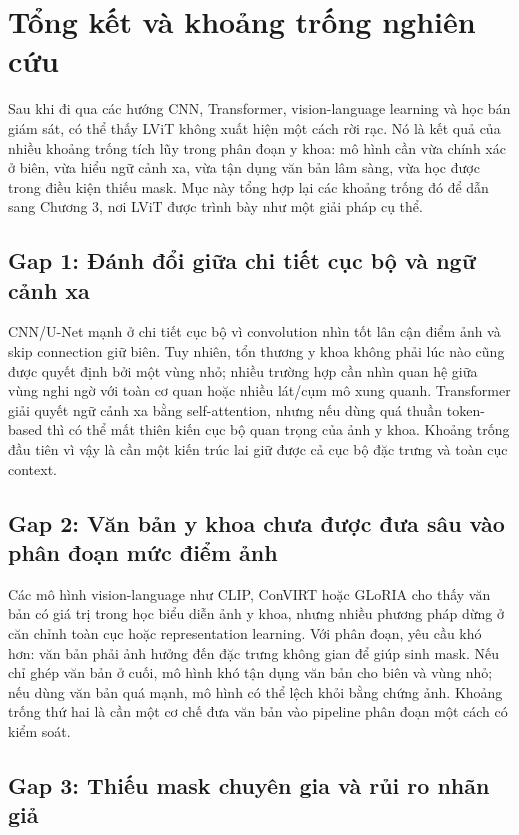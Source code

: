 \section{Tổng kết và khoảng trống nghiên cứu}

Sau khi đi qua các hướng CNN, Transformer, vision-language learning và học bán giám sát, có thể thấy LViT không xuất hiện một cách rời rạc. Nó là kết quả của nhiều khoảng trống tích lũy trong phân đoạn y khoa: mô hình cần vừa chính xác ở biên, vừa hiểu ngữ cảnh xa, vừa tận dụng văn bản lâm sàng, vừa học được trong điều kiện thiếu mask. Mục này tổng hợp lại các khoảng trống đó để dẫn sang Chương 3, nơi LViT được trình bày như một giải pháp cụ thể.

\subsection{Gap 1: Đánh đổi giữa chi tiết cục bộ và ngữ cảnh xa}

CNN/U-Net mạnh ở chi tiết cục bộ vì convolution nhìn tốt lân cận điểm ảnh và skip connection giữ biên. Tuy nhiên, tổn thương y khoa không phải lúc nào cũng được quyết định bởi một vùng nhỏ; nhiều trường hợp cần nhìn quan hệ giữa vùng nghi ngờ với toàn cơ quan hoặc nhiều lát/cụm mô xung quanh. Transformer giải quyết ngữ cảnh xa bằng self-attention, nhưng nếu dùng quá thuần token-based thì có thể mất thiên kiến cục bộ quan trọng của ảnh y khoa. Khoảng trống đầu tiên vì vậy là cần một kiến trúc lai giữ được cả cục bộ đặc trưng và toàn cục context.

\subsection{Gap 2: Văn bản y khoa chưa được đưa sâu vào phân đoạn mức điểm ảnh}

Các mô hình vision-language như CLIP, ConVIRT hoặc GLoRIA cho thấy văn bản có giá trị trong học biểu diễn ảnh y khoa, nhưng nhiều phương pháp dừng ở căn chỉnh toàn cục hoặc representation learning. Với phân đoạn, yêu cầu khó hơn: văn bản phải ảnh hưởng đến đặc trưng không gian để giúp sinh mask. Nếu chỉ ghép văn bản ở cuối, mô hình khó tận dụng văn bản cho biên và vùng nhỏ; nếu dùng văn bản quá mạnh, mô hình có thể lệch khỏi bằng chứng ảnh. Khoảng trống thứ hai là cần một cơ chế đưa văn bản vào pipeline phân đoạn một cách có kiểm soát.

\subsection{Gap 3: Thiếu mask chuyên gia và rủi ro nhãn giả}

